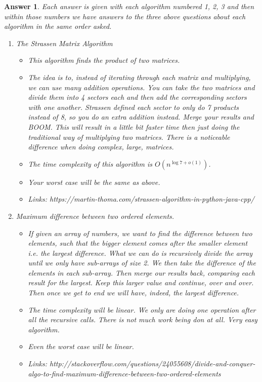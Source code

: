 \documentclass[11pt]{article}
\newtheorem{answer}{Answer}
\begin{document}
\begin{answer}
 \label{ans:1} Each answer is given with each algorithm numbered 1, 2, 3 and then within those numbers we have answers to the three above questions about each algorithm in the same order asked.
 
 \begin{enumerate}
 	\item The Strassen Matrix Algorithm
 	\begin{itemize}
 		\item This algorithm finds the product of two matrices.
 		\item The idea is to, instead of iterating through each matrix and multiplying, we can use many addition operations. You can take the two matrices and divide them into 4 sectors each and then add the corresponding sectors with one another. Strassen defined each sector to only do 7 products instead of 8, so you do an extra addition instead. Merge your results and BOOM. This will result in a little bit faster time then just doing the traditional way of multiplying two matrices. There is a noticeable difference when doing complex, large, matrices.
 		\item The time complexity of this algorithm is $O(n^{\log7+o(1)})$.
 		\item Your worst case will be the same as above.
 		\item Links: https://martin-thoma.com/strassen-algorithm-in-python-java-cpp/
 	\end{itemize}
 	\item Maximum difference between two ordered elements.
 	\begin{itemize}
 		\item If given an array of numbers, we want to find the difference between two elements, such that the bigger element comes after the smaller element i.e. the largest difference. What we can do is recursively divide the array until we only have sub-arrays of size 2. We then take the difference of the elements in each sub-array. Then merge our results back, comparing each result for the largest. Keep this larger value and continue, over and over. Then once we get to end we will have, indeed, the largest difference.
 		\item The time complexity will be linear. We only are doing one operation after all the recursive calls. There is not much work being don at all. Very easy algorithm.
 		\item Even the worst case will be linear.
 		\item Links: http://stackoverflow.com/questions/24055608/divide-and-conquer-algo-to-find-maximum-difference-between-two-ordered-elements

\end{itemize}
\end{enumerate}
\end{answer}
\end{document}
